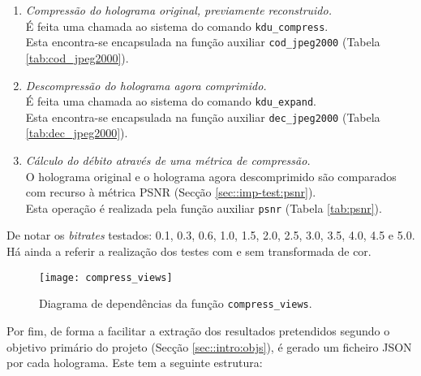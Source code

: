 \begin{enumerate}
    \item \textit{Compressão do holograma original, previamente reconstruido.} \\
        É feita uma chamada ao sistema do comando \verb|kdu_compress|.\\ Esta encontra-se encapsulada na função auxiliar \verb|cod_jpeg2000| (Tabela \ref{tab:cod_jpeg2000}).
    \item \textit{Descompressão do holograma agora comprimido.} \\
        É feita uma chamada ao sistema do comando \verb|kdu_expand|.\\ Esta encontra-se encapsulada na função auxiliar \verb|dec_jpeg2000| (Tabela \ref{tab:dec_jpeg2000}).
    \item \textit{Cálculo do débito através de uma métrica de compressão.} \\
        O holograma original e o holograma agora descomprimido são comparados com recurso à métrica \ac{PSNR} (Secção \ref{sec::imp-test:psnr}).\\ Esta operação é realizada pela função auxiliar \verb|psnr| (Tabela \ref{tab:psnr}).
\end{enumerate}

De notar os \textit{bitrates} testados: \SI{0.1}{}, \SI{0.3}{}, \SI{0.6}{}, \SI{1.0}{}, \SI{1.5}{}, \SI{2.0}{}, \SI{2.5}{}, \SI{3.0}{}, \SI{3.5}{}, \SI{4.0}{}, \SI{4.5}{} e \SI{5.0}{}. Há ainda a referir a realização dos testes com e sem transformada de cor.

\begin{figure}[!htbp]
    \centering
    \texttt{[image: compress\_views]}
    \caption{Diagrama de dependências da função \texttt{compress\_views}.}
    \label{fig:compress_views}
\end{figure}

Por fim, de forma a facilitar a extração dos resultados pretendidos segundo o objetivo primário do projeto (Secção \ref{sec::intro:objs}), é gerado um ficheiro \ac{JSON} por cada holograma. Este tem a seguinte estrutura:

\begin{figure}[!h]
\end{figure}

